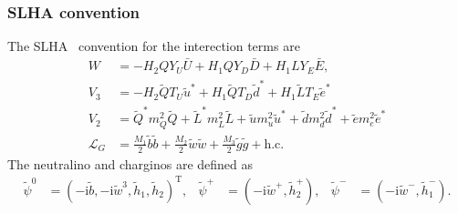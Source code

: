 \documentclass[a4paper,11pt,captions=tableheading,DIV=12]{scrartcl}
\newcommand\ii{\mathrm{i}}
\newcommand{\bU}{\bar U}
\newcommand{\bD}{\bar D}
\newcommand{\bE}{\bar E}
\newcommand{\tra}{^{\mathrm T}}
\begin{document}
\subsubsection{SLHA convention}
The SLHA~\cite{SLHA} convention for the interection terms are
\begin{align}
 W &=
 - H_2 QY_U\bU
 + H_1 QY_D\bD
 + H_1 LY_E\bE,
\tag{SLHA:3}\\
 V_3 &=
 - H_2 \tilde Q T_U \tilde u^*
 + H_1 \tilde Q T_D \tilde d^*
 + H_1 \tilde L T_E \tilde e^*
\tag{SLHA:5}\\
 V_2 &=
  \tilde Q^*m_{Q}^{2} \tilde Q
 + \tilde L^*m_{L}^{2} \tilde L
 + \tilde u  m_{u}^{2} \tilde u^*
 + \tilde d  m_{d}^{2} \tilde d^*
 + \tilde e  m_{e}^{2} \tilde e^*
\tag{SLHA:7}\\
 \mathcal L_G &= \frac{M_1}{2}\tilde b\tilde b+\frac{M_2}{2}\tilde w\tilde w+\frac{M_3}{2}\tilde g\tilde g + \text{h.c.}
\tag{SLHA:9}
\end{align}
The neutralino and charginos are defined as
\begin{align}
 \tilde\psi^0&=(-\ii\tilde b,-\ii\tilde w^3,\tilde h_1,\tilde h_2)\tra,
&
\tilde\psi^+&=(-\ii\tilde w^+,\tilde h_2^+),
&
\tilde\psi^-&=(-\ii\tilde w^-,\tilde h_1^-).
\tag{SLHA:10+13}
\end{align}
\end{document}

